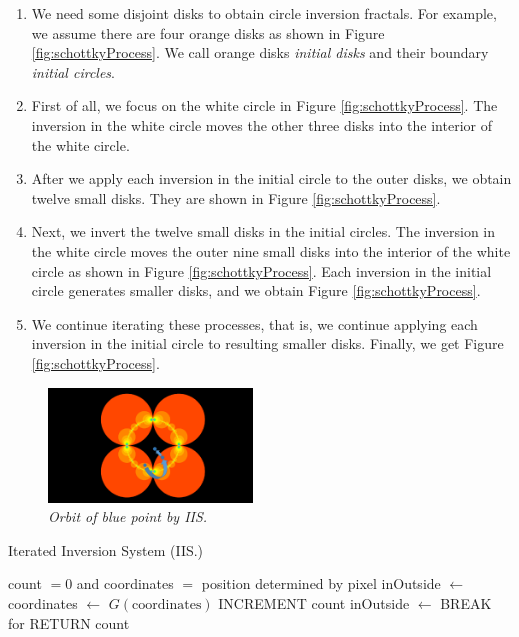 \begin{enumerate}
 \item We need some disjoint disks to obtain circle inversion fractals.
       For example, we assume there are four orange disks as shown in
       Figure \ref{fig:schottkyProcess}. We call orange disks \textit{initial
       disks} and their boundary \textit{initial circles}.
 \item First of all, we focus on the white circle in Figure
       \ref{fig:schottkyProcess}. The inversion in the white circle moves the
       other three disks into the interior of the white circle.
 \item After we apply each inversion in the initial circle to the outer disks,
       we obtain twelve small disks. They are shown in Figure \ref{fig:schottkyProcess}.
 \item Next, we invert the twelve small disks in the initial circles.
       The inversion in the white circle moves the outer nine small disks
       into the interior of the white circle as shown in Figure \ref{fig:schottkyProcess}.
       Each inversion in the initial circle generates smaller disks, and we
       obtain Figure \ref{fig:schottkyProcess}.
 \item We continue iterating these processes, that is, we continue
       applying each inversion in the initial circle to resulting
       smaller disks.
       Finally, we get Figure \ref{fig:schottkyProcess}.
\end{enumerate}

\begin{figure}[htbp]
  \center
  \includegraphics[height=1.2in, keepaspectratio]{img/preparation/orbIIS.png}
  \caption{\textit{Orbit of blue point by IIS.}}
  \label{fig:iisOrbit}
 \hspace*{\fill}
\end{figure}

 \begin{algorithm}
  \caption{Iterated Inversion System (IIS.)}
  \label{arg:iis2d}
  \begin{algorithmic}
   \REQUIRE count $= 0$ and coordinates $=$ position determined by
   pixel
   \STATE inOutside $\leftarrow$ \TRUE
   \STATE coordinates $\leftarrow$ $G(\text{coordinates})$
   \STATE INCREMENT count
   \STATE inOutside $\leftarrow$ \FALSE
   \ENDIF
   \ENDFOR
   \STATE BREAK for
   \ENDIF
   \ENDFOR
   \STATE RETURN count
  \end{algorithmic}
 \end{algorithm}

